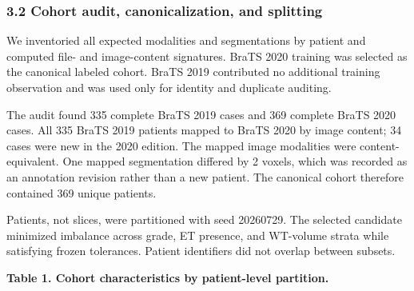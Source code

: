 \documentclass[
  10pt,
  letterpaper,
]{article}
\begin{document}
\subsubsection{3.2 Cohort audit, canonicalization, and
splitting}\label{cohort-audit-canonicalization-and-splitting}

We inventoried all expected modalities and segmentations by patient and
computed file- and image-content signatures. BraTS 2020 training was
selected as the canonical labeled cohort. BraTS 2019 contributed no
additional training observation and was used only for identity and
duplicate auditing.

The audit found 335 complete BraTS 2019 cases and 369 complete BraTS
2020 cases. All 335 BraTS 2019 patients mapped to BraTS 2020 by image
content; 34 cases were new in the 2020 edition. The mapped image
modalities were content-equivalent. One mapped segmentation differed by
2 voxels, which was recorded as an annotation revision rather than a new
patient. The canonical cohort therefore contained 369 unique patients.

Patients, not slices, were partitioned with seed 20260729. The selected
candidate minimized imbalance across grade, ET presence, and WT-volume
strata while satisfying frozen tolerances. Patient identifiers did not
overlap between subsets.

\textbf{Table 1. Cohort characteristics by patient-level partition.}
\end{document}
